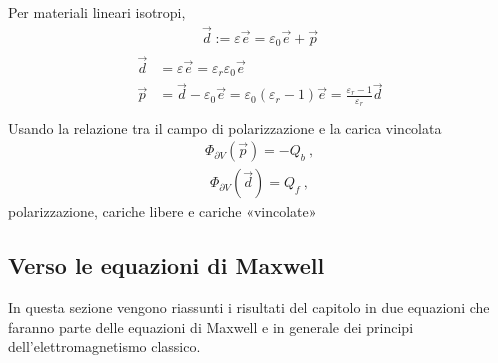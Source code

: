 \documentclass[letterpaper,10pt,italian]{jupyterBook}
\begin{document}
\sphinxAtStartPar
Per materiali lineari isotropi,
\begin{equation*}
\begin{split}\vec{d} := \varepsilon \vec{e} = \varepsilon_0 \vec{e} + \vec{p}\end{split}
\end{equation*}\begin{equation*}
\begin{split}\begin{aligned}
  \vec{d} & = \varepsilon \vec{e} = \varepsilon_r \varepsilon_0 \vec{e}  \\
  \vec{p} & = \vec{d} - \varepsilon_0 \vec{e} = \varepsilon_0 (\varepsilon_r - 1) \vec{e} = \frac{\varepsilon_r - 1}{\varepsilon_r} \vec{d}  \\
\end{aligned}\end{split}
\end{equation*}
\sphinxAtStartPar
Usando la relazione tra il campo di polarizzazione e la carica vincolata
\begin{equation*}
\begin{split}\Phi_{\partial V}(\vec{p}) = - Q_b \ ,\end{split}
\end{equation*}\begin{equation*}
\begin{split}\Phi_{\partial V}(\vec{d}) =   Q_f \ ,\end{split}
\end{equation*}
\sphinxAtStartPar
{} polarizzazione, cariche libere e cariche «vincolate»


\subsection{Verso le equazioni di Maxwell}
\label{\detokenize{ch/electromagnetism/electrostatics:verso-le-equazioni-di-maxwell}}\label{\detokenize{ch/electromagnetism/electrostatics:physics-hs-electromagnetism-electrostatics-maxwell}}
\sphinxAtStartPar
In questa sezione vengono riassunti i risultati del capitolo in due equazioni che faranno parte delle equazioni di Maxwell e in generale dei principi dell’elettromagnetismo classico.
\end{document}
